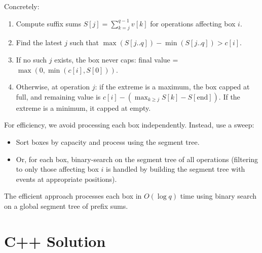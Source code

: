 \documentclass[11pt,a4paper]{article}
\begin{document}
Concretely:
\begin{enumerate}
  \item Compute suffix sums $S[j] = \sum_{k=j}^{q-1} v[k]$ for operations affecting box $i$.
  \item Find the latest $j$ such that $\max(S[j..q]) - \min(S[j..q]) > c[i]$.
  \item If no such $j$ exists, the box never caps: final value = $\max(0, \min(c[i], S[0]))$.
  \item Otherwise, at operation $j$: if the extreme is a maximum, the box capped at full, and remaining value is $c[i] - (\max_{k \ge j} S[k] - S[\text{end}])$. If the extreme is a minimum, it capped at empty.
\end{enumerate}

For efficiency, we avoid processing each box independently. Instead, use a sweep:
\begin{itemize}
  \item Sort boxes by capacity and process using the segment tree.
  \item Or, for each box, binary-search on the segment tree of all operations (filtering to only those affecting box $i$ is handled by building the segment tree with events at appropriate positions).
\end{itemize}

The efficient approach processes each box in $O(\log q)$ time using binary search on a global segment tree of prefix sums.

\section{C++ Solution}
\end{document}
